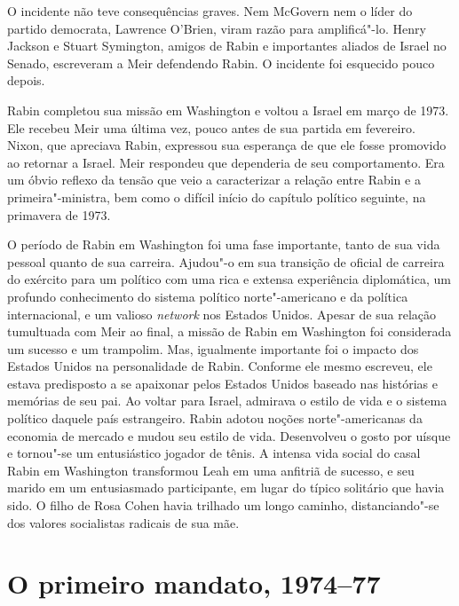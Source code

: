 O incidente não teve consequências graves. Nem McGovern nem o líder do
partido democrata, Lawrence O'Brien, viram razão para amplificá"-lo.
Henry Jackson e Stuart Symington, amigos de Rabin e importantes aliados
de Israel no Senado, escreveram a Meir defendendo Rabin. O incidente foi
esquecido pouco depois.

Rabin completou sua missão em Washington e voltou a Israel em março de
1973. Ele recebeu Meir uma última vez, pouco antes de sua partida em
fevereiro. Nixon, que apreciava Rabin, expressou sua esperança de que
ele fosse promovido ao retornar a Israel. Meir respondeu que dependeria
de seu comportamento. Era um óbvio reflexo da tensão que veio a
caracterizar a relação entre Rabin e a primeira"-ministra, bem como o difícil
início do capítulo político seguinte, na primavera de 1973.

O período de Rabin em Washington foi uma fase importante, tanto de sua
vida pessoal quanto de sua carreira. Ajudou"-o em sua transição de
oficial de carreira do exército para um político com uma rica e extensa
experiência diplomática, um profundo conhecimento do sistema político
norte"-americano e da política internacional, e um valioso \textit{network}
nos Estados Unidos. Apesar de sua relação tumultuada com Meir ao final,
a missão de Rabin em Washington foi considerada um sucesso e um
trampolim. Mas, igualmente importante foi o impacto dos Estados Unidos
na personalidade de Rabin. Conforme ele mesmo escreveu, ele estava
predisposto a se apaixonar pelos Estados Unidos baseado nas histórias e
memórias de seu pai. Ao voltar para Israel, admirava o estilo de vida e o
sistema político daquele país estrangeiro. Rabin adotou noções norte"-americanas da
economia de mercado e mudou seu estilo de vida. Desenvolveu o gosto por
uísque e tornou"-se um entusiástico jogador de tênis. A intensa vida
social do casal Rabin em Washington transformou Leah em uma anfitriã de
sucesso, e seu marido em um entusiasmado participante, em lugar do típico
solitário que havia sido. O filho de Rosa Cohen havia trilhado um longo
caminho, distanciando"-se dos valores socialistas radicais de sua mãe.

\chapter[O primeiro mandato, 1974--77]{O primeiro mandato, 1974--77}

